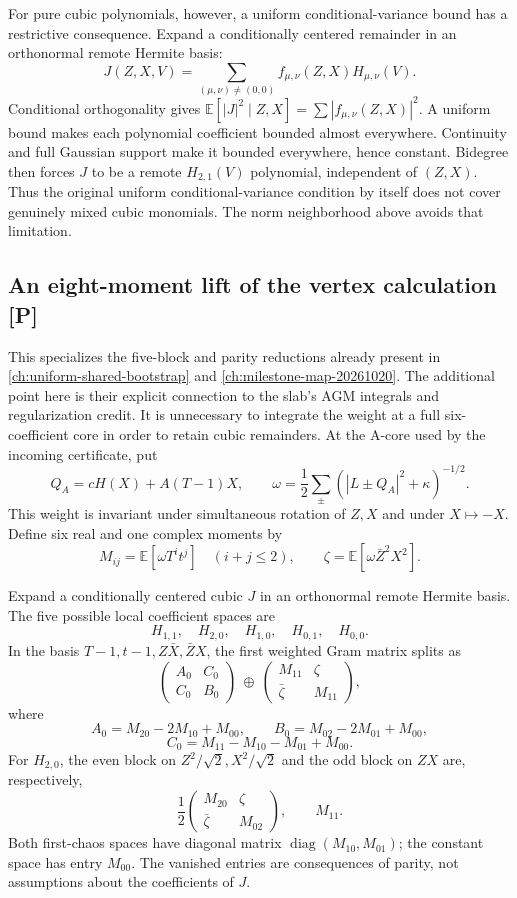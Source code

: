 For pure cubic polynomials, however, a uniform conditional-variance
bound has a restrictive consequence. Expand a conditionally centered
remainder in an orthonormal remote Hermite basis:
\[
J(Z,X,V)=\sum_{(\mu,\nu)\ne(0,0)}
f_{\mu,\nu}(Z,X)H_{\mu,\nu}(V).
\]
Conditional orthogonality gives
\(\mathbb E[|J|^2\mid Z,X]=\sum|f_{\mu,\nu}(Z,X)|^2\).
A uniform bound makes each polynomial coefficient bounded almost
everywhere. Continuity and full Gaussian support make it bounded
everywhere, hence constant. Bidegree then forces \(J\) to be a
remote \(H_{2,1}(V)\) polynomial, independent of \((Z,X)\).
Thus the original uniform conditional-variance condition by itself
does not cover genuinely mixed cubic monomials.
The norm neighborhood above avoids that limitation.

\subsection{An eight-moment lift of the vertex calculation [P]}
This specializes the five-block and parity reductions already present
in \autoref{ch:uniform-shared-bootstrap} and \autoref{ch:milestone-map-20261020}. The additional point here is their explicit
connection to the slab's AGM integrals and regularization credit.
It is unnecessary to integrate the weight at a full six-coefficient
core in order to retain cubic remainders. At the A-core used by the
incoming certificate, put
\[
Q_A=cH(X)+A(T-1)X,\qquad
\omega=\frac12\sum_\pm(|L\pm Q_A|^2+\kappa)^{-1/2}.
\]
This weight is invariant under simultaneous rotation of \(Z,X\) and
under \(X\mapsto-X\). Define six real and one complex moments by
\[
M_{ij}=\mathbb E[\omega T^it^j]\quad(i+j\le2),
\qquad \zeta=\mathbb E[\omega\bar Z^2X^2].
\]

Expand a conditionally centered cubic \(J\) in an orthonormal remote
Hermite basis. The five possible local coefficient spaces are
\[
H_{1,1},\quad H_{2,0},\quad H_{1,0},\quad H_{0,1},\quad H_{0,0}.
\]
In the basis \(T-1,t-1,Z\bar X,\bar ZX\), the first weighted Gram
matrix splits as
\[
\begin{pmatrix}A_0&C_0\\C_0&B_0\end{pmatrix}
\ \oplus\
\begin{pmatrix}M_{11}&\zeta\\\bar\zeta&M_{11}\end{pmatrix},
\]
where
\[
A_0=M_{20}-2M_{10}+M_{00},\qquad
B_0=M_{02}-2M_{01}+M_{00},
\]
\[
C_0=M_{11}-M_{10}-M_{01}+M_{00}.
\]
For \(H_{2,0}\), the even block on \(Z^2/\sqrt2,X^2/\sqrt2\)
and the odd block on \(ZX\) are, respectively,
\[
\frac12\begin{pmatrix}M_{20}&\zeta\\\bar\zeta&M_{02}\end{pmatrix},
\qquad M_{11}.
\]
Both first-chaos spaces have diagonal matrix
\(\operatorname{diag}(M_{10},M_{01})\); the constant space has
entry \(M_{00}\). The vanished entries are consequences of parity,
not assumptions about the coefficients of \(J\).


